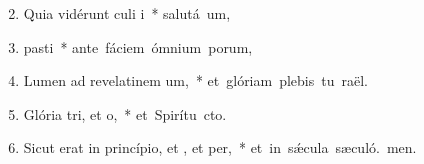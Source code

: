 \begin{flushleft}
\begin{enumerate}[leftmargin=*]
\setcounter{enumi}{1}

\item Quia vidérunt culi i~* \mbox{salutá um,}
\item {} pasti~* \mbox{ante fáciem ómnium porum,}
\item Lumen ad revelatinem um,~* \mbox{et glóriam plebis tu raël.}
\item Glória tri, et o,~* \mbox{et Spirítu cto.}
\item Sicut erat in princípio, et , et per,~* \mbox{et in s\'{\ae}cula sæculó. men.}

\end{enumerate}
\end{flushleft}

